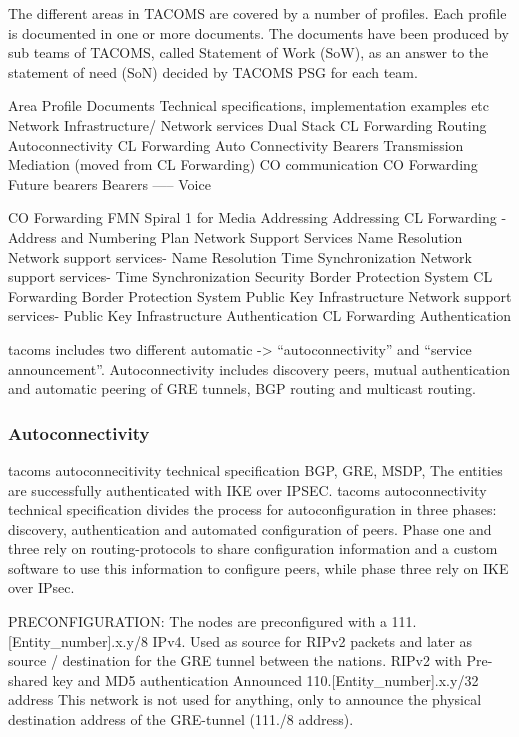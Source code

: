 The different areas in TACOMS are covered by a number of profiles. Each profile is documented in one or more documents. The documents have been produced by sub teams of TACOMS, called Statement of Work (SoW), as an answer to the statement of need (SoN) decided by TACOMS PSG for each team.

Area
Profile
Documents
Technical specifications, implementation examples etc
Network Infrastructure/ Network services
Dual Stack
CL Forwarding Routing
Autoconnectivity
CL Forwarding Auto Connectivity
Bearers Transmission Mediation
(moved from CL Forwarding)
CO communication
CO Forwarding
Future bearers
Bearers -----
Voice


CO Forwarding
FMN Spiral 1 for Media
Addressing
Addressing
CL Forwarding -  Address and Numbering Plan
Network Support Services
Name Resolution
Network support services- Name Resolution
Time Synchronization
Network support services- Time Synchronization
Security
Border Protection System 
CL Forwarding Border Protection System
Public Key Infrastructure
Network support services- Public Key Infrastructure
Authentication
CL Forwarding Authentication

\gls{tacoms} includes two different automatic -> “autoconnectivity” and “service announcement”. Autoconnectivity includes discovery peers, mutual authentication and automatic peering of GRE tunnels, BGP routing and multicast routing. 

\subsubsection{Autoconnectivity}
\gls{tacoms} autoconnecitivity technical specification \cite{tacoms_t6_autoconf_techspec}
BGP, GRE, MSDP,
The entities are successfully authenticated with IKE over IPSEC. 
\gls{tacoms} autoconnectivity technical specification \cite{tacoms_t6_autoconf_techspec} divides the process for autoconfiguration in three phases: discovery, authentication and automated configuration of peers. Phase one and three rely on routing-protocols to share configuration information and a custom software to use this information to configure peers, while phase three rely on IKE over IPsec.


PRECONFIGURATION:
The nodes are preconfigured with a 111.[Entity_number].x.y/8 IPv4. 
Used as source for RIPv2 packets and later as source / destination for the GRE tunnel between the nations. 
RIPv2 with
Pre-shared key and MD5 authentication
Announced 110.[Entity_number].x.y/32 address 
This network is not used for anything, only to announce the physical destination address of the GRE-tunnel (111./8 address). 

